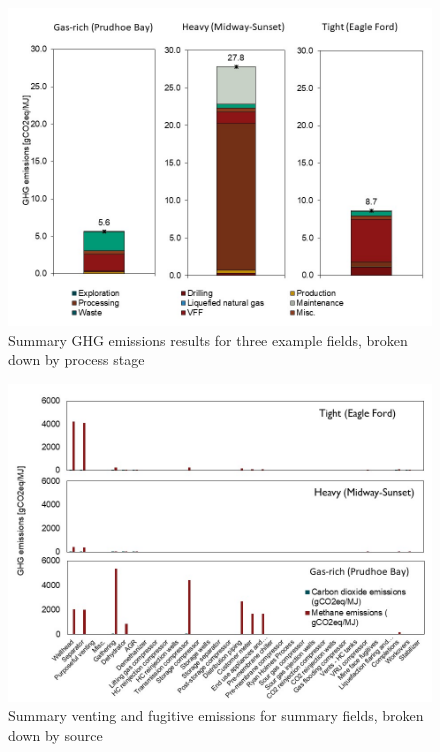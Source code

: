 \documentclass[11pt]{report}
\begin{document}
\begin{figure}[!htbp]
\includegraphics[width=1\columnwidth]{documentation/images/User_Guide_figs/ghgintensity.jpg}
\caption{Summary GHG emissions results for three example fields, broken down by process stage}
\label{fig:example_ghgsummary}
\end{figure}

\begin{figure}[!htbp]
\includegraphics[width=1\columnwidth]{documentation/images/User_Guide_figs/vffsource.jpg}
\caption{Summary venting and fugitive emissions for summary fields, broken down by source}
\label{fig:example_vffsummary}
\end{figure}
\end{document}

